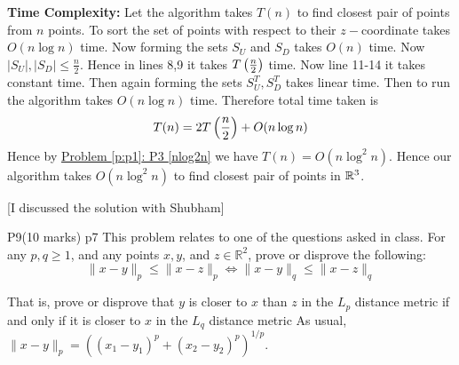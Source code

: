 \documentclass[a4paper, 11pt]{article}
\begin{document}
{\begin{enumerate}[label=(\alph*)]
	\begin{algorithm}
	\DontPrintSemicolon
	\caption{}
\end{algorithm}
\parinf

\textbf{Time Complexity:} Let the algorithm takes $T(n)$ to find closest pair of points from $n$ points. To sort the set of points with respect to their $z-$coordinate takes $O(n\log n)$ time. Now forming the sets $S_U$ and $S_D$ takes $O(n)$ time. Now $|S_U|,|S_D|\leq \frac{n}{2}$. Hence in lines 8,9 it takes $T\left(\frac{n}{2}\right)$ time. Now line 11-14 it takes constant time. Then again forming the sets $S_U^T,S_D^T$ takes linear time. Then to run the algorithm  takes $O(n\log n)$ time. Therefore total time taken is $$T(n)=2T\left(\frac{n}2\right)+O(n\log n)$$Hence by \hyperref[p:p1]{Problem \ref{p:p1}: P3 \ref{nlog2n}} we have $T(n)=O(n\log^2n)$. Hence our algorithm takes $O(n\log^2n)$ to find closest pair of points in $\mathbb{R}^3$.
\end{enumerate}
}\parinf

[I discussed the solution with Shubham]

\begin{problem}{%
		P9\hfill  (10 marks)
	}{p7%
	}
This problem relates to one of the questions asked in class. For any $p, q \geq 1$, and any points $x, y$, and $z \in \mathbb{R}^2$, prove or disprove the following:
		$$
		\|x-y\|_p \leq\|x-z\|_p \Leftrightarrow\|x-y\|_q \leq\|x-z\|_q
		$$

	
	That is, prove or disprove that $y$ is closer to $x$ than $z$ in the $L_p$ distance metric if and only if it is closer to $x$ in the $L_q$ distance metric
	As usual, $\|x-y\|_p=\left(\left(x_1-y_1\right)^p+\left(x_2-y_2\right)^p\right)^{1 / p}$.
\end{problem}
\end{document}
